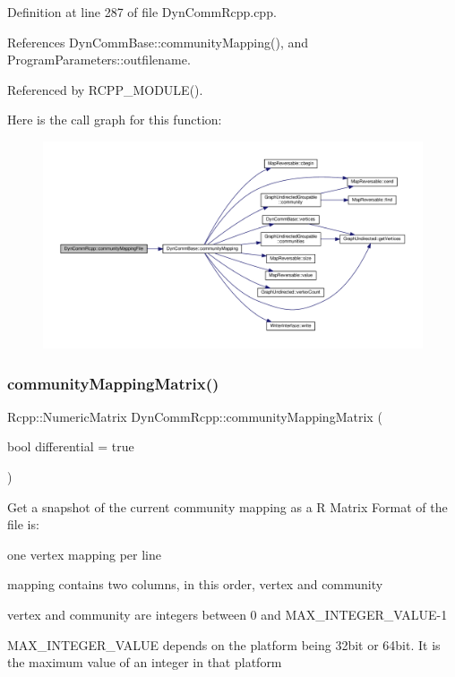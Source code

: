 Definition at line 287 of file Dyn\+Comm\+Rcpp.\+cpp.



References Dyn\+Comm\+Base\+::community\+Mapping(), and Program\+Parameters\+::outfilename.



Referenced by R\+C\+P\+P\+\_\+\+M\+O\+D\+U\+L\+E().

Here is the call graph for this function\+:
\nopagebreak
\begin{figure}[H]
\begin{center}
\leavevmode
\includegraphics[width=350pt]{classDynCommRcpp_a132aff4ca6f76fd006b2faccbfd01e04_cgraph}
\end{center}
\end{figure}
\mbox{\label{classDynCommRcpp_aaa996ab5e558887d3bc5394af78a2e95}} 
\subsubsection{\texorpdfstring{community\+Mapping\+Matrix()}{communityMappingMatrix()}}
{\footnotesize\ttfamily Rcpp\+::\+Numeric\+Matrix Dyn\+Comm\+Rcpp\+::community\+Mapping\+Matrix (\begin{DoxyParamCaption}\item[{bool}]{differential = {\ttfamily true} }\end{DoxyParamCaption})\hspace{0.3cm}{\ttfamily [inline]}}

Get a snapshot of the current community mapping as a R Matrix Format of the file is\+:
\begin{DoxyItemize}
\item one vertex mapping per line
\item mapping contains two columns, in this order, vertex and community
\item vertex and community are integers between 0 and M\+A\+X\+\_\+\+I\+N\+T\+E\+G\+E\+R\+\_\+\+V\+A\+L\+U\+E-\/1
\item M\+A\+X\+\_\+\+I\+N\+T\+E\+G\+E\+R\+\_\+\+V\+A\+L\+UE depends on the platform being 32bit or 64bit. It is the maximum value of an integer in that platform 
\end{DoxyItemize}

